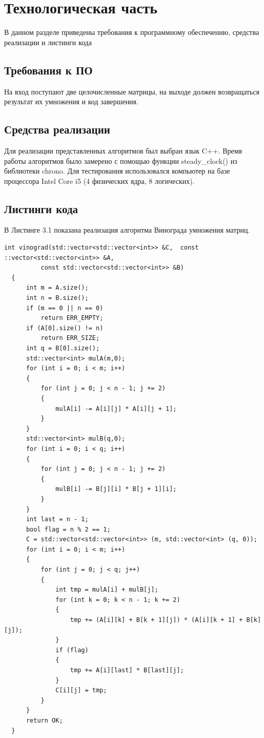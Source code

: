 \documentclass[a4paper,12pt]{report}
\begin{document}
\chapter{Технологическая часть}
\hspace{0.6cm}В данном разделе приведены требования к программному обеспечению, средства реализации и листинги кода
\section{Требования к ПО}

\hspace{0.6cm}На вход поступают две целочисленные матрицы, на выходе должен возвращаться результат их умножения и код завершения.
	
\section{Средства реализации}
\hspace{0.6cm}Для реализации представленных алгоритмов был выбран язык C++. Время работы алгоритмов было замерено с помощью функции steady\_clock() из библиотеки chrono. Для тестирования использовался компьютер на базе процессора Intel Core i5 (4 физических ядра, 8 логических).

\section{Листинги кода}

\hspace{0.6cm}В Листинге 3.1 показана реализация алгоритма Винограда умножения матриц.

\begin{lstlisting}[caption=Функция умножения матриц алгоритмом Винограда]
  int vinograd(std::vector<std::vector<int>> &C,  const ::vector<std::vector<int>> &A,
          const std::vector<std::vector<int>> &B)
  {
      int m = A.size();
      int n = B.size();
      if (m == 0 || n == 0)
          return ERR_EMPTY;
      if (A[0].size() != n)
          return ERR_SIZE;
      int q = B[0].size();
      std::vector<int> mulA(m,0);
      for (int i = 0; i < m; i++)
      {
          for (int j = 0; j < n - 1; j += 2)
          {
              mulA[i] -= A[i][j] * A[i][j + 1];
          }
      }
      std::vector<int> mulB(q,0);
      for (int i = 0; i < q; i++)
      {
          for (int j = 0; j < n - 1; j += 2)
          {
              mulB[i] -= B[j][i] * B[j + 1][i];
          }
      }
      int last = n - 1;
      bool flag = n % 2 == 1;
      C = std::vector<std::vector<int>> (m, std::vector<int> (q, 0));
      for (int i = 0; i < m; i++)
      {
          for (int j = 0; j < q; j++)
          {
              int tmp = mulA[i] + mulB[j];
              for (int k = 0; k < n - 1; k += 2)
              {
                  tmp += (A[i][k] + B[k + 1][j]) * (A[i][k + 1] + B[k][j]);
              }
              if (flag)
              {
                  tmp += A[i][last] * B[last][j];
              }
              C[i][j] = tmp;
          }
      }
      return OK;
  }
\end{lstlisting}
\end{document}
